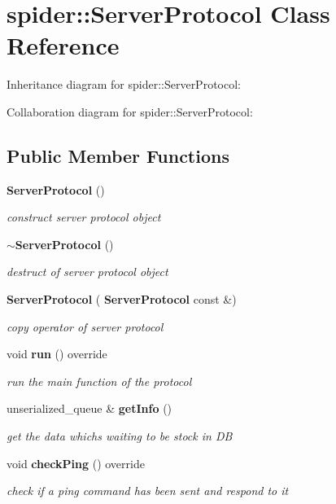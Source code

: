 \section{spider\+:\+:Server\+Protocol Class Reference}
\label{classspider_1_1_server_protocol}


Inheritance diagram for spider\+:\+:Server\+Protocol\+:


Collaboration diagram for spider\+:\+:Server\+Protocol\+:
\subsection*{Public Member Functions}
\begin{DoxyCompactItemize}
\item 
\mbox{\label{classspider_1_1_server_protocol_af84520983479ef6e777da34cb58c2e24}} 
\textbf{ Server\+Protocol} ()
\begin{DoxyCompactList}\small\item\em construct server protocol object \end{DoxyCompactList}\item 
\mbox{\label{classspider_1_1_server_protocol_a958496b2694df2d62c37c363022af169}} 
\textbf{ $\sim$\+Server\+Protocol} ()
\begin{DoxyCompactList}\small\item\em destruct of server protocol object \end{DoxyCompactList}\item 
\mbox{\label{classspider_1_1_server_protocol_a866603c79adf96b04f6d9229b52280ed}} 
\textbf{ Server\+Protocol} (\textbf{ Server\+Protocol} const \&)
\begin{DoxyCompactList}\small\item\em copy operator of server protocol \end{DoxyCompactList}\item 
\mbox{\label{classspider_1_1_server_protocol_ad3198a38584d643bd0eb9d86ca1213b4}} 
void \textbf{ run} () override
\begin{DoxyCompactList}\small\item\em run the main function of the protocol \end{DoxyCompactList}\item 
unserialized\+\_\+queue \& \textbf{ get\+Info} ()
\begin{DoxyCompactList}\small\item\em get the data which\textquotesingle{}s waiting to be stock in DB \end{DoxyCompactList}\item 
\mbox{\label{classspider_1_1_server_protocol_a9d5d13c8c470e6ef400a08f210b161c7}} 
void \textbf{ check\+Ping} () override
\begin{DoxyCompactList}\small\item\em check if a ping command has been sent and respond to it \end{DoxyCompactList}\end{DoxyCompactItemize}

